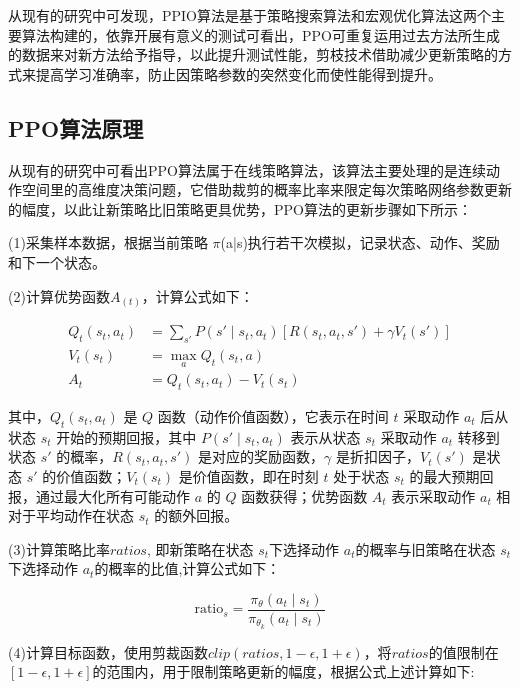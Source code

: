 从现有的研究中可发现，PPIO算法是基于策略搜索算法和宏观优化算法这两个主要算法构建的，依靠开展有意义的测试可看出，PPO可重复运用过去方法所生成的数据来对新方法给予指导，以此提升测试性能，剪枝技术借助减少更新策略的方式来提高学习准确率，防止因策略参数的突然变化而使性能得到提升。

\subsection{PPO算法原理 }

从现有的研究中可看出PPO算法属于在线策略算法，该算法主要处理的是连续动作空间里的高维度决策问题，它借助裁剪的概率比率来限定每次策略网络参数更新的幅度，以此让新策略比旧策略更具优势，PPO算法的更新步骤如下所示\cite{JSJJ20250416003}：

(1)采集样本数据，根据当前策略 $\pi$(a|s)执行若干次模拟，记录状态、动作、奖励和下一个状态。

(2)计算优势函数$𝐴_(t)$，计算公式如下：

\begin{align}
	Q_t(s_t, a_t) &= \sum_{s'} P(s' \mid s_t, a_t) \left[ R(s_t, a_t, s') + \gamma V_t(s') \right] \\
	V_t(s_t) &= \max_a Q_t(s_t, a) \\
	A_t &= Q_t(s_t, a_t) - V_t(s_t)
\end{align}

其中，\( Q_t(s_t, a_t) \) 是 \( Q \) 函数（动作价值函数），它表示在时间 \( t \) 采取动作 \( a_t \) 后从状态 \( s_t \) 开始的预期回报，其中 \( P(s' \mid s_t, a_t) \) 表示从状态 \( s_t \) 采取动作 \( a_t \) 转移到状态 \( s' \) 的概率，\( R(s_t, a_t, s') \) 是对应的奖励函数，\( \gamma \) 是折扣因子，\( V_t(s') \) 是状态 \( s' \) 的价值函数；\( V_t(s_t) \) 是价值函数，即在时刻 \( t \) 处于状态 \( s_t \) 的最大预期回报，通过最大化所有可能动作 \( a \) 的 \( Q \) 函数获得；优势函数 \( A_t \) 表示采取动作 \( a_t \) 相对于平均动作在状态 \( s_t \) 的额外回报。

(3)计算策略比率\(ratios\), 即新策略在状态 \( s_t \)下选择动作 \( a_t \)的概率与旧策略在状态 \( s_t \)下选择动作 \( a_t \)的概率的比值,计算公式如下：

\begin{equation}
	\text{ratio}_s = \frac{\pi_\theta(a_t \mid s_t)}{\pi_{\theta_k}(a_t \mid s_t)}
\end{equation}

(4)计算目标函数，使用剪裁函数\(𝑐𝑙𝑖𝑝(𝑟𝑎𝑡𝑖𝑜𝑠, 1 − 𝜖, 1 + 𝜖)\)，将\(ratios\)的值限制在\([1 − 𝜖, 1 + 𝜖]\)的范围内，用于限制策略更新的幅度，根据公式上述计算如下:

